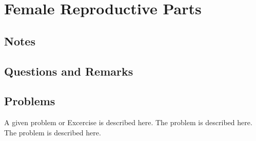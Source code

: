 %
%
%
\chapter{Female Reproductive Parts}
\label{Female} %








\abstract{}


\section{Notes}
\label{sec:NOTE19}

\section{Questions and Remarks}
\label{sec:QR19}






%
%
%


\section*{Problems}
%
\begin{prob}
\label{prob1}
A given problem or Excercise is described here. The
problem is described here. The problem is described here.
\end{prob}




